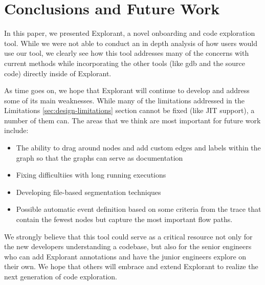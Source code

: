 \chapter{Conclusions and Future Work}
In this paper, we presented Explorant, a novel onboarding and code exploration tool. While we were not able to conduct an in depth analysis of how users would use our tool, we clearly see how this tool addresses many of the concerns with current methods while incorporating the other tools (like gdb and the source code) directly inside of Explorant. 

As time goes on, we hope that Explorant will continue to develop and address some of its main weaknesses. While many of the limitations addressed in the Limitations \ref{sec:design-limitations} section cannot be fixed (like JIT support), a number of them can. The areas that we think are most important for future work include:
\begin{itemize}
\item The ability to drag around nodes and add custom edges and labels within the graph so that the graphs can serve as documentation
\item Fixing difficultiies with long running executions 
\item Developing file-based segmentation techniques
\item Possible automatic event definition based on some criteria from the trace that contain the fewest nodes but capture the most important flow paths. 
\end{itemize}

We strongly believe that this tool could serve as a critical resource not only for the new developers understanding a codebase, but also for the senior engineers who can add Explorant annotations and have the junior engineers explore on their own. We hope that others will embrace and extend Explorant to realize the next generation of code exploration. 

